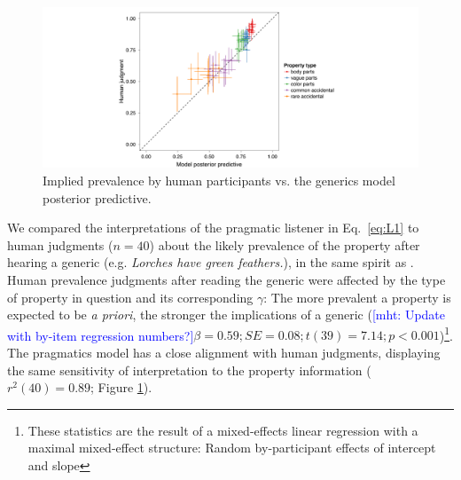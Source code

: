 \documentclass[10pt,letterpaper]{article}
\newcommand{\ndg}[1]{\textcolor{Green}{[ndg: #1]}}
\newcommand{\mht}[1]{\textcolor{Blue}{[mht: #1]}}
\begin{document}


\begin{figure}
\centering
    \includegraphics[width=0.6\columnwidth]{implied-byItem-mh100kX2.pdf}
    \caption{Implied prevalence by human participants vs. the generics model posterior predictive.}
  \label{fig:impliedByItem}
\end{figure}


We compared the interpretations of the pragmatic listener in Eq.~\ref{eq:L1} to human judgments ($n=40$) about the likely prevalence of the property after hearing a generic (e.g. \emph{Lorches have green feathers.}), in the same spirit as . 
Human prevalence judgments after reading the generic were affected by the type of property in question and its corresponding $\gamma$: The more prevalent a property is expected to be \emph{a priori}, the stronger the implications of a generic (\mht{Update with by-item regression numbers?}$\beta = 0.59; SE = 0.08; t(39) = 7.14; p < 0.001$)\footnote{These statistics are the result of a mixed-effects linear regression with a maximal mixed-effect structure: Random by-participant effects of intercept and slope}. 
The pragmatics model has a close alignment with human judgments, displaying the same sensitivity of interpretation to the property information ($r^2(40)=0.89$; Figure \ref{fig:impliedByItem}). 







\end{document}
